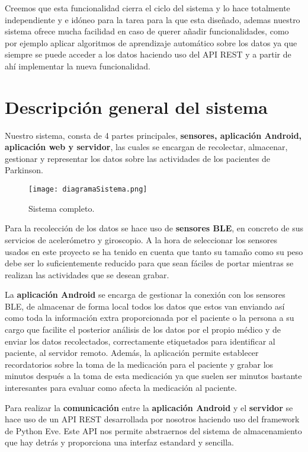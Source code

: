 Creemos que esta funcionalidad cierra el ciclo del sistema y lo hace totalmente independiente y e idóneo para la tarea para la que esta diseñado, ademas nuestro sistema ofrece mucha facilidad en caso de querer añadir funcionalidades, como por ejemplo aplicar algoritmos de aprendizaje automático sobre los datos ya que siempre se puede acceder a los datos haciendo uso del API REST y a partir de ahí implementar la nueva funcionalidad.
\newpage

\section{Descripción general del sistema}
Nuestro sistema, consta de 4 partes principales, \textbf{sensores, aplicación Android, aplicación web y servidor}, las cuales se encargan de recolectar, almacenar, gestionar y representar los datos sobre las actividades de los pacientes de Parkinson.
\newline 

\begin{figure}[H]
  \centering
  \texttt{[image: diagramaSistema.png]}
  \caption{Sistema completo.}
\end{figure}

Para la recolección de los datos se hace uso de \textbf{sensores BLE}, en concreto de sus servicios de acelerómetro y giroscopio. A la hora de seleccionar los sensores usados en este proyecto se ha tenido en cuenta que tanto su tamaño como su peso debe ser lo suficientemente reducido para que sean fáciles de portar mientras se realizan las actividades que se desean grabar.
\newline

La \textbf{aplicación Android} se encarga de gestionar la conexión con los sensores BLE, de almacenar de forma local todos los datos que estos van enviando así como toda la información extra proporcionada por el paciente o la persona a su cargo que facilite el posterior análisis de los datos por el propio médico y de enviar los datos recolectados, correctamente etiquetados para identificar al paciente, al servidor remoto. Además, la aplicación permite establecer recordatorios sobre la toma de la medicación para el paciente y grabar los minutos después a la toma de esta medicación ya que suelen ser minutos bastante interesantes para evaluar como afecta la medicación al paciente.
\newline

Para realizar la \textbf{comunicación} entre la \textbf{aplicación Android} y el \textbf{servidor} se hace uso de un API REST desarrollada por nosotros haciendo uso del framework de Python Eve. Este API nos permite abstraernos del sistema de almacenamiento que hay detrás y proporciona una interfaz estandard y sencilla.
\newline

